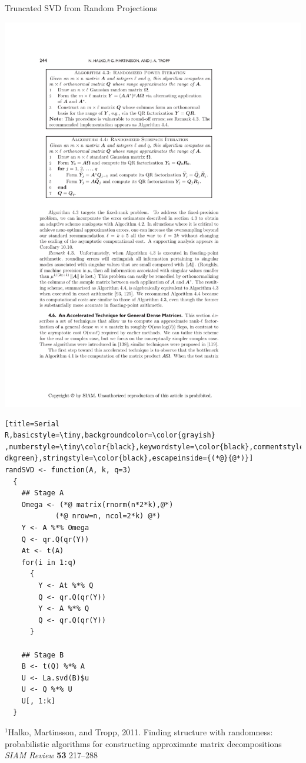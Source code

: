 \begin{frame}[fragile]
\begin{block}{Truncated SVD from Random Projections\footnotemark}
\begin{minipage}{.55\textwidth}
\begin{center}
      \includegraphics[width=.95\textwidth]{../common/pics/randSVDalg4_4}
    \end{center}
  \end{minipage}
  \begin{minipage}{0.430\textwidth}
\begin{lstlisting}[title=Serial 
R,basicstyle=\tiny,backgroundcolor=\color{grayish} 
,numberstyle=\tiny\color{black},keywordstyle=\color{black},commentstyle=\color{ 
dkgreen},stringstyle=\color{black},escapeinside={(*@}{@*)}]
randSVD <- function(A, k, q=3)
  {
    ## Stage A
    Omega <- (*@ matrix(rnorm(n*2*k),@*) 
            (*@ nrow=n, ncol=2*k) @*)
    Y <- A %*% Omega
    Q <- qr.Q(qr(Y))
    At <- t(A)
    for(i in 1:q)
      {
        Y <- At %*% Q
        Q <- qr.Q(qr(Y))
        Y <- A %*% Q
        Q <- qr.Q(qr(Y))
      }
    
    ## Stage B
    B <- t(Q) %*% A
    U <- La.svd(B)$u
    U <- Q %*% U
    U[, 1:k]
  }
\end{lstlisting} %
\end{minipage}
{\fontsize{6pt}{10}\selectfont $^1$Halko, Martinsson, 
  and Tropp, 2011. Finding structure with randomness: probabilistic algorithms 
  for constructing approximate matrix decompositions \emph{SIAM Review} \textbf{53} 
  217--288}
\end{block}
\end{frame}


